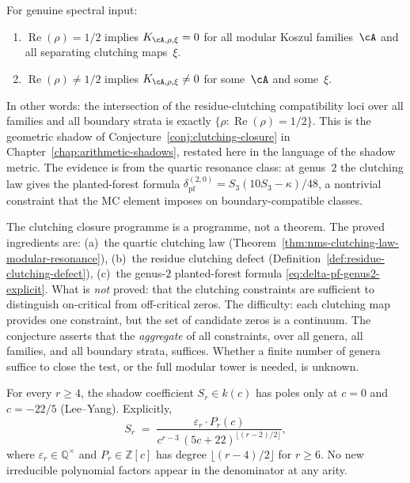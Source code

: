 \begin{conjecture}%
\label{conj:clutching-closure-shadow}%
\ClaimStatusConjectured%
%
For genuine spectral input\textup{:}
\begin{enumerate}[label=\textup{(\roman*)}]
\item
$\operatorname{Re}(\rho) = 1/2$ implies
$K_{\cA,\rho,\xi} = 0$ for all modular Koszul
families~$\cA$ and all separating clutching maps~$\xi$.
\item
$\operatorname{Re}(\rho) \neq 1/2$ implies
$K_{\cA,\rho,\xi} \neq 0$ for some~$\cA$ and
some~$\xi$.
\end{enumerate}
In other words: the intersection of the residue-clutching
compatibility loci over all families and all boundary strata
is exactly $\{\rho : \operatorname{Re}(\rho) = 1/2\}$.
This is the geometric shadow of
Conjecture~\textup{\ref{conj:clutching-closure}}
in Chapter~\textup{\ref{chap:arithmetic-shadows}},
restated here in the language of the shadow metric.
The evidence is from the quartic resonance class: at genus~$2$
the clutching law gives the planted-forest formula
$\delta_{\mathrm{pf}}^{(2,0)} = S_3(10S_3 - \kappa)/48$,
a nontrivial constraint that the MC element imposes on
boundary-compatible classes.
\end{conjecture}

\begin{remark}%
\label{rem:clutching-closure-honest}%
%
The clutching closure programme is a programme, not a theorem.
The proved ingredients are:
\textup{(a)}~the quartic clutching law
(Theorem~\ref{thm:nms-clutching-law-modular-resonance}),
\textup{(b)}~the residue clutching defect
(Definition~\ref{def:residue-clutching-defect}),
\textup{(c)}~the genus-$2$ planted-forest formula
\eqref{eq:delta-pf-genus2-explicit}.
What is \emph{not} proved:
that the clutching constraints are sufficient to
distinguish on-critical from off-critical zeros.
The difficulty: each clutching map provides one constraint,
but the set of candidate zeros is a continuum.
The conjecture asserts that the
\emph{aggregate} of all constraints, over all genera, all
families, and all boundary strata, suffices.
Whether a finite number of genera
suffice to close the test, or the full modular tower is
needed, is unknown.
\end{remark}

\begin{proposition}
\label{prop:pole-purity}
\ClaimStatusProvedHere
{}
For every $r \geq 4$, the shadow coefficient $S_r \in k(c)$ has poles only at $c = 0$ and $c = -22/5$ \textup{(}Lee--Yang\textup{)}.  Explicitly,
\[
  S_r
  \;=\;
  \frac{\varepsilon_r \cdot P_r(c)}{c^{r-3}\,(5c+22)^{\lfloor(r-2)/2\rfloor}},
\]
where $\varepsilon_r \in \mathbb{Q}^\times$ and $P_r \in \mathbb{Z}[c]$ has degree $\lfloor(r-4)/2\rfloor$ for $r \geq 6$.  No new irreducible polynomial factors appear in the denominator at any arity.
\end{proposition}

